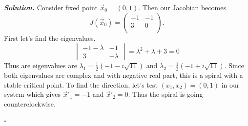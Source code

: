 \documentclass[12pt]{report}
\newenvironment{solution}[1][\it{Solution}]{\textbf{#1. } }{$\square$}
\newcommand{\paren}[1]{{\left(#1\right)}} %
\begin{document}
\begin{solution}
    \noindent 
    Consider fixed point $\vec{x}_0 = (0,1)$. Then our Jacobian becomes
    \[ J(\vec{x}_0) = \left(
        \begin{array}{cc}
         -1 & -1 \\
         3 & 0 \\
        \end{array}
        \right).
    \]
    First let's find the eigenvalues.
    \[ 
        \begin{vmatrix}
            -1 - \lambda & -1\\
            3 & -\lambda
        \end{vmatrix} = \lambda^2 + \lambda + 3 = 0
    \]
    Thus are eigenvalues are $\lambda_1 = \frac{1}{2}\paren{-1 - i\sqrt{11}}$ and $\lambda_2 = \frac{1}{2}\paren{-1 + i\sqrt{11}}$. Since both eigenvalues are complex and with negative real part, this is a spiral with a stable critical point. To find the direction, let's test $(x_1,x_2) = (0,1)$ in our system which gives $\vec{x}'_1 = -1$ and $\vec{x}'_2 = 0$. Thus the spiral is going counterclockwise. 
    

\end{solution}
\end{document}
